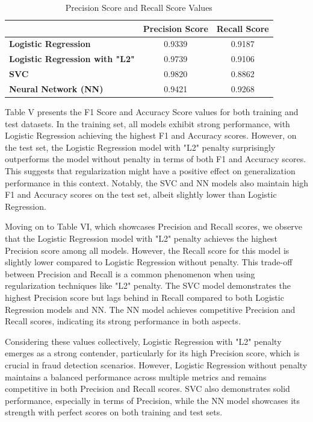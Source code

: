 \documentclass[conference]{IEEEtran}
\begin{document}
\begin{table}[htbp]
\centering
\begin{tabular}{@{}lcc@{}}
\toprule
\textbf{} & \textbf{Precision Score} & \textbf{Recall Score} \\ \midrule
\textbf{Logistic Regression} & 0.9339 & 0.9187 \\
\textbf{Logistic Regression with "L2"} & 0.9739 & 0.9106 \\
\textbf{SVC} & 0.9820 & 0.8862 \\
\textbf{Neural Network (NN)} & 0.9421 & 0.9268 \\ \bottomrule
\end{tabular}
\caption{Precision Score and Recall Score Values}
\label{tab:svm-comparison}
\end{table}

Table V presents the F1 Score and Accuracy Score values for both training and test datasets. In the training set, all models exhibit strong performance, with Logistic Regression achieving the highest F1 and Accuracy scores. However, on the test set, the Logistic Regression model with "L2" penalty surprisingly outperforms the model without penalty in terms of both F1 and Accuracy scores. This suggests that regularization might have a positive effect on generalization performance in this context. Notably, the SVC and NN models also maintain high F1 and Accuracy scores on the test set, albeit slightly lower than Logistic Regression.

Moving on to Table VI, which showcases Precision and Recall scores, we observe that the Logistic Regression model with "L2" penalty achieves the highest Precision score among all models. However, the Recall score for this model is slightly lower compared to Logistic Regression without penalty. This trade-off between Precision and Recall is a common phenomenon when using regularization techniques like "L2" penalty. The SVC model demonstrates the highest Precision score but lags behind in Recall compared to both Logistic Regression models and NN. The NN model achieves competitive Precision and Recall scores, indicating its strong performance in both aspects.

Considering these values collectively, Logistic Regression with "L2" penalty emerges as a strong contender, particularly for its high Precision score, which is crucial in fraud detection scenarios. However, Logistic Regression without penalty maintains a balanced performance across multiple metrics and remains competitive in both Precision and Recall scores. SVC also demonstrates solid performance, especially in terms of Precision, while the NN model showcases its strength with perfect scores on both training and test sets.
\end{document}
